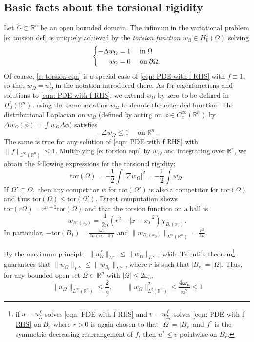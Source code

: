 \documentclass[10pt, reqno]{amsart}
\numberwithin{equation}{section}
\def\R{{\mathbb R}}
\def\W{\Omega}
\def\om{\omega}
\def\tor{\mathrm{tor}}
\def\na{\nabla}
\begin{document}
\subsection{Basic facts about the torsional rigidity}
Let $\W\subset \R^n$ be an open bounded domain. The infimum in the variational problem \eqref{e: torsion def} is uniquely achieved by the {\it torsion function} $w_\W \in H^1_0(\W)$ solving
\begin{equation}
	\label{e: torsion eqn}
\begin{cases}
\hfill	-\Delta w_\W = 1 & \text{ in }\W\\
\hfill	w_\W = 0 & \text{ on } \partial \W.
\end{cases}
\end{equation}
Of course, \eqref{e: torsion eqn} is a special case of  \eqref{eqn: PDE with f RHS} with $f \equiv 1$, so that $w_\W = u_\W^1 $ in the notation introduced there. As for eigenfunctions and solutions to \eqref{eqn: PDE with f RHS}, we extend $w_\W$ by zero to be defined in $H^1_0(\R^n)$, using the same notation $w_\W$ to denote the extended function. The distributional Laplacian on $w_\W$ (defined by acting on $\phi \in C^\infty_c(\R^n)$ by $\Delta w_\W(\phi) = \int w_\W \Delta \phi$) satisfies
\begin{equation*}
    -\Delta w_\W \leq 1 \quad\text{ on } \R^n\, .
\end{equation*}
The same is true for any solution of \eqref{eqn: PDE with f RHS} with $\| f\|_{L^\infty(\R^n)}\leq 1.$
Multiplying \eqref{e: torsion eqn} by $w_\W$ and integrating over $\R^n$, we obtain the following expressions for the torsional rigidity:
\begin{equation}\label{e: torsion and dir energy}
\tor(\W) = -\frac{1}{2} \int |\na w_\W|^2 = -\frac{1}{2} \int w_\W.
\end{equation}
If $\W'\subset \W,$ then any competitor $w $ for $\tor(\W')$ is also a competitor for $\tor (\W)$ and thus $\tor(\W) \leq \tor(\W')$. Direct computation shows $\tor\left(r \W \right) = r^{n+2} \tor (\Omega)$ and that 
the torsion function on a ball is 
\begin{equation}
 	\label{eqn: tor function on a ball}
 w_{B_r(x_0)} = \frac{1}{2n}(r^2 - |x-x_0|^2 ) \chi_{B_r(x_0)}. 
  \end{equation}
In particular, $-\tor(B_1)  = \frac{\omega_n}{2n(n+2)}$ and $\| w_{B_r(x_0)}\|_{L^\infty(\R^n)} =\frac{r^2}{2n}$.

By the maximum principle, $\| u_\W^f\|_{L^\infty}  \leq \| w_\W\|_{L^\infty}$, while
 Talenti's theorem\footnote{if $u=u_\W^f$ solves \eqref{eqn: PDE with f RHS} 
and $v= u_{B_r}^{f^*}$ solves \eqref{eqn: PDE with f RHS} on $B_r$ 
 where $r>0$ is again chosen to that $|\W| = |B_r|$ and $f^*$ is the symmetric decreasing rearrangement of $f$, then $u^* \leq v$ pointwise on $B_r$. } \cite{Talenti1976} guarantees that $\| w_\W\|_{L^\infty} \leq \|w_{B_r}\|_{L^\infty}$, where $r$ is such that $|B_r|=|\W|$. 
Thus, for any bounded open set $\W \subset \R^n$ with $|\W| \leq 2 \omega_n$, 
\begin{equation}
    \label{eqn: bound for tor fn}
\| w_\W\|_{L^\infty(\R^n)} \leq \frac{2}{n}, \qquad \| w_\W\|_{L^2(\R^n)}^2 \leq \frac{4\om_n}{n^2} \leq 1
\end{equation}
\end{document}
